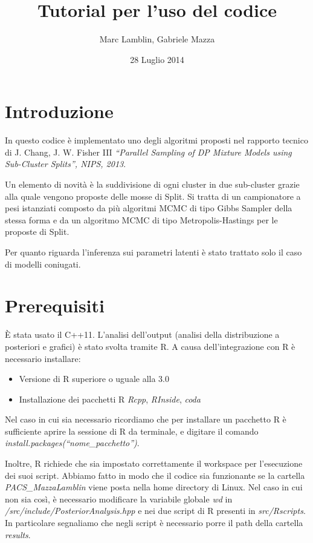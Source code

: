 \documentclass[a4paper,12pt]{report}							%
\date{28 Luglio 2014}
\author{Marc Lamblin, Gabriele Mazza}
\title{Tutorial per l'uso del codice}
\begin{document}
\maketitle

\tableofcontents

\chapter{Introduzione}

In questo codice è implementato uno degli algoritmi proposti nel rapporto tecnico di 
J. Chang, J. W. Fisher III \textit{``Parallel Sampling of DP Mixture Models using Sub-Cluster Splits'', NIPS, 2013}. 

Un elemento di novità è la suddivisione di ogni cluster in due sub-cluster grazie alla quale vengono proposte delle mosse 
di Split. Si tratta di un campionatore a pesi istanziati composto da più algoritmi MCMC di tipo Gibbs Sampler della 
stessa forma e da un algoritmo MCMC di tipo Metropolis-Hastings per le proposte di Split.

Per quanto riguarda l'inferenza 
sui parametri latenti è stato trattato solo il caso di modelli coniugati. 

\chapter{Prerequisiti}
È stata usato il C++11. L'analisi dell'output (analisi della distribuzione a posteriori e grafici) è stato svolta tramite R. 
A causa dell'integrazione con R è necessario installare:
\begin{itemize}
 \item Versione di R superiore o uguale alla 3.0
 \item Installazione dei pacchetti R \textit{Rcpp}, \textit{RInside}, \textit{coda}
\end{itemize}
Nel caso in cui sia necessario ricordiamo che per installare un pacchetto R è sufficiente aprire la sessione di R 
da terminale, e digitare il comando \textit{install.packages(``nome\_pacchetto'')}.

Inoltre, R richiede che sia impostato correttamente il workspace per l'esecuzione dei suoi script. 
Abbiamo fatto in modo che il codice sia funzionante se la cartella \textit{PACS\_MazzaLamblin} viene posta nella 
home directory di Linux. 
Nel caso in cui non sia così, è necessario modificare la variabile globale \textit{wd} in 
\textit{/src/include/PosteriorAnalysis.hpp} e nei due script di R presenti in \textit{src/Rscripts}. In particolare
segnaliamo che negli script è necessario porre il path della cartella \textit{results}.
\end{document}
